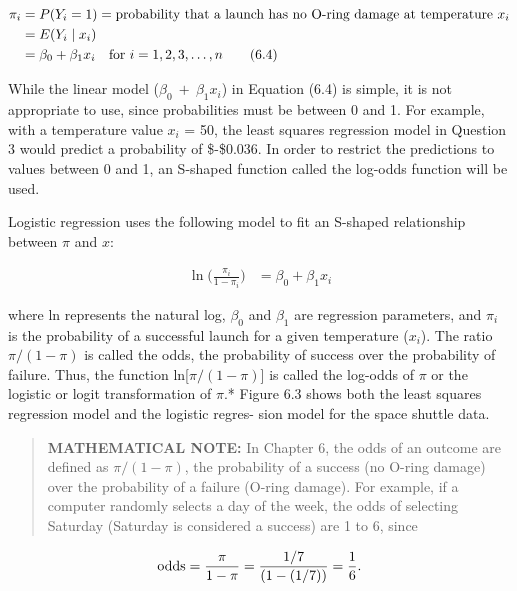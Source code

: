 \documentclass[
]{report}
\begin{document}
\begin{align}
\pi_i &= P(Y_i = 1) = \text{probability that a launch has no O-ring damage at temperature } x_i \notag \\
      &= E(Y_i \mid x_i) \notag \\
      &= \beta_0 + \beta_1 x_i \quad \text{for } i = 1,2,3,\dots,n \tag{6.4}
\end{align}

While the linear model (\(\scriptstyle \beta_0 \ +\  \beta_1 x_i\)) in Equation (6.4) is simple, it is not appropriate to use, since probabilities must be between 0 and 1. For example, with a temperature value \(\scriptstyle x_i\) = 50, the least squares regression model in Question 3 would predict a probability of \$-\$0.036. In order to restrict the predictions to values between 0 and 1, an S-shaped function called the log-odds function will be used.

Logistic regression uses the following model to fit an S-shaped relationship between \(\scriptstyle \pi\) and \(\scriptstyle x\):

\begin{align}
\ln\bigl(\frac{\pi_i}{1 - \pi_i}\bigr) &= \beta_0 + \beta_1 x_i 
\tag{6.5}
\end{align}

where ln represents the natural log, \(\scriptstyle \beta_0\) and \(\scriptstyle \beta_1\) are regression parameters, and \(\scriptstyle \pi_i\) is the probability of a successful launch for a given temperature (\(\scriptstyle x_i\)). The ratio \(\scriptstyle \pi/(1 - \pi)\) is called the odds, the probability of success over the probability of failure. Thus, the function ln{[}\(\scriptstyle \pi/(1 - \pi)\){]} is called the log-odds of \(\scriptstyle \pi\) or the logistic or logit transformation of \(\scriptstyle \pi\).* Figure 6.3 shows both the least squares regression model and the logistic regres-
sion model for the space shuttle data.

\begin{quote}
\textbf{MATHEMATICAL NOTE:} In Chapter 6, the odds of an outcome are defined as \(\scriptstyle \pi/(1 - \pi)\), the probability of a success (no O-ring damage) over the probability of a failure (O-ring damage). For example, if a computer randomly selects a day of the week, the odds of selecting Saturday (Saturday is considered a success) are 1 to 6, since
\end{quote}

\begin{align}
\text{odds} = \frac{\pi}{1 - \pi} = \frac{1/7}{(1 - (1/7))} = \frac{1}{6}.
\notag
\end{align}
\end{document}
